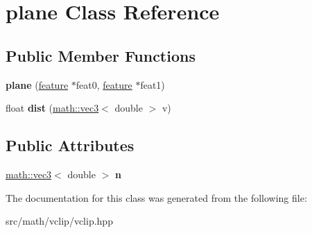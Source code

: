 \hypertarget{classplane}{
\section{plane Class Reference}
\label{classplane}
}
\subsection*{Public Member Functions}
\begin{DoxyCompactItemize}
\item 
\hypertarget{classplane_a86ba049725c9bd1993d4412c29a12771}{
{\bfseries plane} (\hyperlink{classfeature}{feature} $\ast$feat0, \hyperlink{classfeature}{feature} $\ast$feat1)}
\label{classplane_a86ba049725c9bd1993d4412c29a12771}

\item 
\hypertarget{classplane_ab360defcdb0573c45611bb707d53c826}{
float {\bfseries dist} (\hyperlink{classmath_1_1vec3}{math::vec3}$<$ double $>$ v)}
\label{classplane_ab360defcdb0573c45611bb707d53c826}

\end{DoxyCompactItemize}
\subsection*{Public Attributes}
\begin{DoxyCompactItemize}
\item 
\hypertarget{classplane_a9bd98f5ad825cc37b1f8304306b1273a}{
\hyperlink{classmath_1_1vec3}{math::vec3}$<$ double $>$ {\bfseries n}}
\label{classplane_a9bd98f5ad825cc37b1f8304306b1273a}

\end{DoxyCompactItemize}


The documentation for this class was generated from the following file:\begin{DoxyCompactItemize}
\item 
src/math/vclip/vclip.hpp\end{DoxyCompactItemize}
